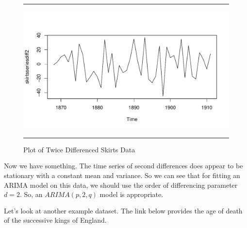 \documentclass[11pt, letterpaper, twoside]{memoir}\usepackage{knitr}
\begin{document}
\begin{figure}
\centering
\rule{4in}{1pt}
\begin{knitrout}
\color{fgcolor}\begin{kframe}
\begin{alltt}
 \hlkwb{<-}  \hlstd{=}\hlstd{)}
\end{alltt}
\end{kframe}
\includegraphics[width=\maxwidth]{figure/unnamed-chunk-118-1} 

\end{knitrout}
\caption{Plot of Twice Differenced Skirts Data}
\label{Fig:twicediffskirts}
\rule{4in}{1pt}
\end{figure}

Now we have something. The time series of second differences does appear to be stationary with a constant mean and variance. So we can see that for fitting an ARIMA model on this data, we should use the order of differencing parameter $d = 2$. So, an $ARIMA(p, 2, q)$ model is appropriate. 

Let's look at another example dataset. The link below provides the age of death of the successive kings of England.
\end{document}
